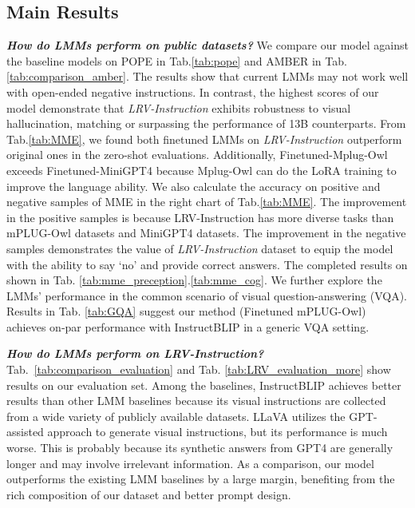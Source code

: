 \vspace{-0.1in}
\subsection{Main Results}

\textbf{\textit{How do LMMs perform on public datasets? }}We compare our model against the baseline models on POPE in Tab.\ref{tab:pope} and AMBER in Tab. \ref{tab:comparison_amber}. The results show that current LMMs may not work well with open-ended negative instructions. In contrast, the highest scores of our model demonstrate that \textit{LRV-Instruction} exhibits robustness to visual hallucination, matching or surpassing the performance of 13B counterparts. From Tab.\ref{tab:MME}, we found both finetuned LMMs on \textit{LRV-Instruction} outperform original ones in the zero-shot evaluations. Additionally, Finetuned-Mplug-Owl exceeds Finetuned-MiniGPT4 because Mplug-Owl can do the LoRA training to improve the language ability. We also calculate the accuracy on positive and negative samples of MME in the right chart of Tab.\ref{tab:MME}. The improvement in the positive samples is because {LRV-Instruction} has more diverse tasks than mPLUG-Owl datasets and MiniGPT4 datasets. The improvement in the negative samples demonstrates the value of \textit{LRV-Instruction} dataset to equip the model with the ability to say ‘no’ and provide correct answers. The completed results on shown in Tab. \ref{tab:mme_preception}.\ref{tab:mme_cog}. We further explore the LMMs' performance in the common scenario of visual question-answering (VQA). Results in Tab. \ref{tab:GQA} suggest our method (Finetuned mPLUG-Owl) achieves on-par performance with InstructBLIP in a generic VQA setting.

\textbf{\textit{How do LMMs perform on \textit{LRV-Instruction}? }}Tab.~\ref{tab:comparison_evaluation} and Tab. \ref{tab:LRV_evaluation_more} show results on our evaluation set. Among the baselines, InstructBLIP achieves better results than other LMM baselines because its visual instructions are collected from a wide variety of publicly available datasets. LLaVA \citep{liu2023visual} utilizes the GPT-assisted approach to generate visual instructions, but its performance is much worse. This is probably because its synthetic answers from GPT4 are generally longer and may involve irrelevant information. As a comparison, our model outperforms the existing LMM baselines by a large margin, benefiting from the rich composition of our dataset and better prompt design. 

